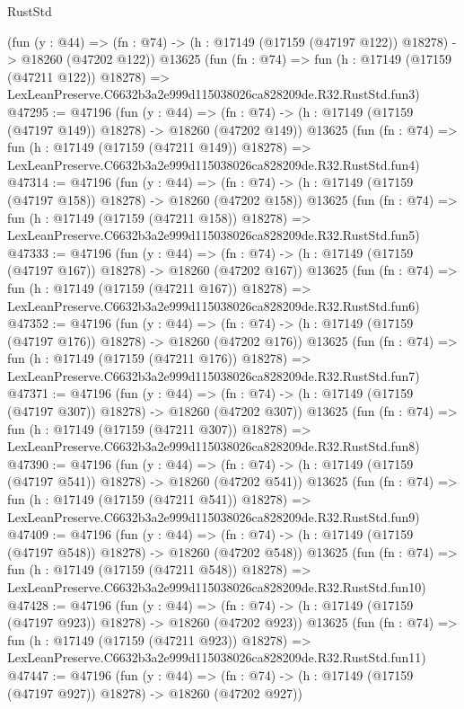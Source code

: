 \begin{lexlean}{RustStd}
\begin{coremodule}
    (fun (y : @44) =>
    (fn : @74) -> (h : @17149 (@17159 (@47197 @122)) @18278) -> @18260 (@47202 @122))
    @13625
    (fun (fn : @74) =>
    fun (h : @17149 (@17159 (@47211 @122)) @18278) =>
    LexLeanPreserve.C6632b3a2e999d115038026ca828209de.R32.RustStd.fun3)
@47295 := @47196
    (fun (y : @44) =>
    (fn : @74) -> (h : @17149 (@17159 (@47197 @149)) @18278) -> @18260 (@47202 @149))
    @13625
    (fun (fn : @74) =>
    fun (h : @17149 (@17159 (@47211 @149)) @18278) =>
    LexLeanPreserve.C6632b3a2e999d115038026ca828209de.R32.RustStd.fun4)
@47314 := @47196
    (fun (y : @44) =>
    (fn : @74) -> (h : @17149 (@17159 (@47197 @158)) @18278) -> @18260 (@47202 @158))
    @13625
    (fun (fn : @74) =>
    fun (h : @17149 (@17159 (@47211 @158)) @18278) =>
    LexLeanPreserve.C6632b3a2e999d115038026ca828209de.R32.RustStd.fun5)
@47333 := @47196
    (fun (y : @44) =>
    (fn : @74) -> (h : @17149 (@17159 (@47197 @167)) @18278) -> @18260 (@47202 @167))
    @13625
    (fun (fn : @74) =>
    fun (h : @17149 (@17159 (@47211 @167)) @18278) =>
    LexLeanPreserve.C6632b3a2e999d115038026ca828209de.R32.RustStd.fun6)
@47352 := @47196
    (fun (y : @44) =>
    (fn : @74) -> (h : @17149 (@17159 (@47197 @176)) @18278) -> @18260 (@47202 @176))
    @13625
    (fun (fn : @74) =>
    fun (h : @17149 (@17159 (@47211 @176)) @18278) =>
    LexLeanPreserve.C6632b3a2e999d115038026ca828209de.R32.RustStd.fun7)
@47371 := @47196
    (fun (y : @44) =>
    (fn : @74) -> (h : @17149 (@17159 (@47197 @307)) @18278) -> @18260 (@47202 @307))
    @13625
    (fun (fn : @74) =>
    fun (h : @17149 (@17159 (@47211 @307)) @18278) =>
    LexLeanPreserve.C6632b3a2e999d115038026ca828209de.R32.RustStd.fun8)
@47390 := @47196
    (fun (y : @44) =>
    (fn : @74) -> (h : @17149 (@17159 (@47197 @541)) @18278) -> @18260 (@47202 @541))
    @13625
    (fun (fn : @74) =>
    fun (h : @17149 (@17159 (@47211 @541)) @18278) =>
    LexLeanPreserve.C6632b3a2e999d115038026ca828209de.R32.RustStd.fun9)
@47409 := @47196
    (fun (y : @44) =>
    (fn : @74) -> (h : @17149 (@17159 (@47197 @548)) @18278) -> @18260 (@47202 @548))
    @13625
    (fun (fn : @74) =>
    fun (h : @17149 (@17159 (@47211 @548)) @18278) =>
    LexLeanPreserve.C6632b3a2e999d115038026ca828209de.R32.RustStd.fun10)
@47428 := @47196
    (fun (y : @44) =>
    (fn : @74) -> (h : @17149 (@17159 (@47197 @923)) @18278) -> @18260 (@47202 @923))
    @13625
    (fun (fn : @74) =>
    fun (h : @17149 (@17159 (@47211 @923)) @18278) =>
    LexLeanPreserve.C6632b3a2e999d115038026ca828209de.R32.RustStd.fun11)
@47447 := @47196
    (fun (y : @44) =>
    (fn : @74) -> (h : @17149 (@17159 (@47197 @927)) @18278) -> @18260 (@47202 @927))

\end{coremodule}
\end{lexlean}
